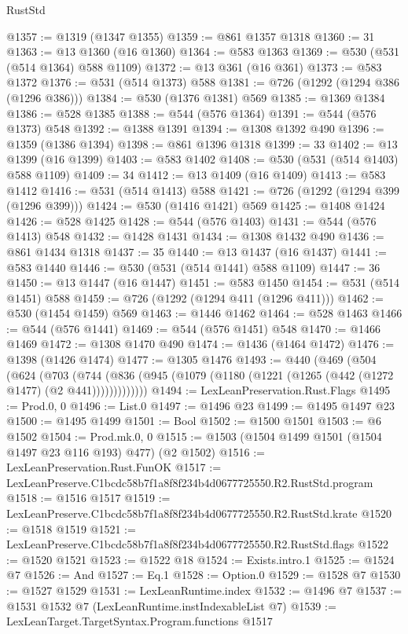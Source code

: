 \begin{lexlean}{RustStd}
\begin{coremodule}
@1357 := @1319 (@1347 @1355)
@1359 := @861 @1357 @1318
@1360 := 31
@1363 := @13 @1360 (@16 @1360)
@1364 := @583 @1363
@1369 := @530 (@531 (@514 @1364) @588 @1109)
@1372 := @13 @361 (@16 @361)
@1373 := @583 @1372
@1376 := @531 (@514 @1373) @588
@1381 := @726 (@1292 (@1294 @386 (@1296 @386)))
@1384 := @530 (@1376 @1381) @569
@1385 := @1369 @1384
@1386 := @528 @1385
@1388 := @544 (@576 @1364)
@1391 := @544 (@576 @1373) @548
@1392 := @1388 @1391
@1394 := @1308 @1392 @490
@1396 := @1359 (@1386 @1394)
@1398 := @861 @1396 @1318
@1399 := 33
@1402 := @13 @1399 (@16 @1399)
@1403 := @583 @1402
@1408 := @530 (@531 (@514 @1403) @588 @1109)
@1409 := 34
@1412 := @13 @1409 (@16 @1409)
@1413 := @583 @1412
@1416 := @531 (@514 @1413) @588
@1421 := @726 (@1292 (@1294 @399 (@1296 @399)))
@1424 := @530 (@1416 @1421) @569
@1425 := @1408 @1424
@1426 := @528 @1425
@1428 := @544 (@576 @1403)
@1431 := @544 (@576 @1413) @548
@1432 := @1428 @1431
@1434 := @1308 @1432 @490
@1436 := @861 @1434 @1318
@1437 := 35
@1440 := @13 @1437 (@16 @1437)
@1441 := @583 @1440
@1446 := @530 (@531 (@514 @1441) @588 @1109)
@1447 := 36
@1450 := @13 @1447 (@16 @1447)
@1451 := @583 @1450
@1454 := @531 (@514 @1451) @588
@1459 := @726 (@1292 (@1294 @411 (@1296 @411)))
@1462 := @530 (@1454 @1459) @569
@1463 := @1446 @1462
@1464 := @528 @1463
@1466 := @544 (@576 @1441)
@1469 := @544 (@576 @1451) @548
@1470 := @1466 @1469
@1472 := @1308 @1470 @490
@1474 := @1436 (@1464 @1472)
@1476 := @1398 (@1426 @1474)
@1477 := @1305 @1476
@1493 := @440
    (@469
      (@504
        (@624
          (@703
            (@744 (@836 (@945 (@1079 (@1180 (@1221 (@1265 (@442 (@1272 @1477) (@2 @441)))))))))))))
@1494 := LexLeanPreservation.Rust.Flags
@1495 := Prod.{0, 0}
@1496 := List.{0}
@1497 := @1496 @23
@1499 := @1495 @1497 @23
@1500 := @1495 @1499
@1501 := Bool
@1502 := @1500 @1501
@1503 := @6 @1502
@1504 := Prod.mk.{0, 0}
@1515 := @1503 (@1504 @1499 @1501 (@1504 @1497 @23 @116 @193) @477) (@2 @1502)
@1516 := LexLeanPreservation.Rust.FunOK
@1517 := LexLeanPreserve.C1bcdc58b7f1a8f8f234b4d0677725550.R2.RustStd.program
@1518 := @1516 @1517
@1519 := LexLeanPreserve.C1bcdc58b7f1a8f8f234b4d0677725550.R2.RustStd.krate
@1520 := @1518 @1519
@1521 := LexLeanPreserve.C1bcdc58b7f1a8f8f234b4d0677725550.R2.RustStd.flags
@1522 := @1520 @1521
@1523 := @1522 @18
@1524 := Exists.intro.{1}
@1525 := @1524 @7
@1526 := And
@1527 := Eq.{1}
@1528 := Option.{0}
@1529 := @1528 @7
@1530 := @1527 @1529
@1531 := LexLeanRuntime.index
@1532 := @1496 @7
@1537 := @1531 @1532 @7 (LexLeanRuntime.instIndexableList @7)
@1539 := LexLeanTarget.TargetSyntax.Program.functions @1517

\end{coremodule}
\end{lexlean}
